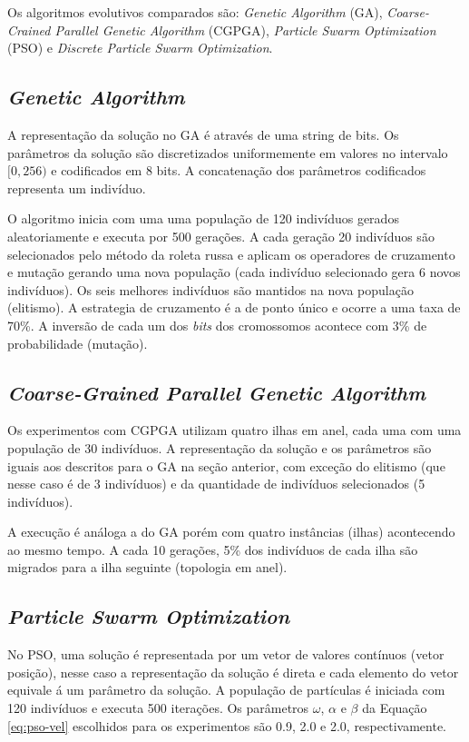 Os algoritmos evolutivos comparados são: \textit{Genetic Algorithm} (GA), \textit{Coarse-Crained Parallel Genetic Algorithm} (CGPGA), \textit{Particle Swarm Optimization} (PSO) e \textit{Discrete Particle Swarm Optimization}.

\subsection{\textit{Genetic Algorithm}}

A representação da solução no GA é através de uma string de bits. Os parâmetros da solução são discretizados uniformemente em valores no intervalo $[0, 256)$ e codificados em 8 bits. A concatenação dos parâmetros codificados representa um indivíduo.

O algoritmo inicia com uma uma população de 120 indivíduos gerados aleatoriamente e executa por 500 gerações. A cada geração 20 indivíduos são selecionados pelo método da roleta russa e aplicam os operadores de cruzamento e mutação gerando uma nova população (cada indivíduo selecionado gera 6 novos indivíduos). Os seis melhores indivíduos são mantidos na nova população (elitismo). A estrategia de cruzamento é a de ponto único e ocorre a uma taxa de 70\%. A inversão de cada um dos \textit{bits} dos cromossomos acontece com 3\% de probabilidade (mutação).

\subsection{\textit{Coarse-Grained Parallel Genetic Algorithm}}

Os experimentos com CGPGA utilizam quatro ilhas em anel, cada uma com uma população de 30 indivíduos. A representação da solução e os parâmetros são iguais aos descritos para o GA na seção anterior, com exceção do elitismo (que nesse caso é de 3 indivíduos) e da quantidade de indivíduos selecionados (5 indivíduos).

A execução é análoga a do GA porém com quatro instâncias (ilhas) acontecendo ao mesmo tempo. A cada 10 gerações, 5\% dos indivíduos de cada ilha são migrados para a ilha seguinte (topologia em anel).

\subsection{\textit{Particle Swarm Optimization}}

No PSO, uma solução é representada por um vetor de valores contínuos (vetor posição), nesse caso a representação da solução é direta e cada elemento do vetor equivale á um parâmetro da solução. A população de partículas é iniciada com 120 indivíduos e executa 500 iterações. Os parâmetros $\omega$, $\alpha$ e $\beta$ da Equação \ref{eq:pso-vel} escolhidos para os experimentos são 0.9, 2.0 e 2.0, respectivamente.

